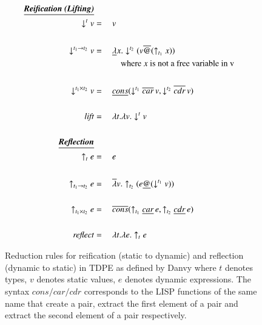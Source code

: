 \documentclass[a4paper,12pt,twoside,openright]{report}
\theoremstyle{definition}
\begin{document}
\newpage
\begin{figure}[htp!]
    \centering
    \begin{alignat}{2}
        \text{\underline{\textbf{\emph{Reification (Lifting)}}}}\nonumber \\
        \downarrow^{t} v & = \: && v \\
        \nonumber \\%
        \downarrow^{t_{1} \rightarrow t_{2}} v & = \: && \underline{\lambda} x.\downarrow^{t_{2}}(v\overline{@}(\uparrow_{t_{1}} x)) \\
        & && \quad\text{where $x$ is not a free variable in v} \nonumber \\
        \nonumber \\%
        \downarrow^{t_{1} \times t_{2}} v & = \: && \underline{cons}(\downarrow^{t_{1}} \overline{car} \, v, \downarrow^{t_{2}} \overline{cdr} \, v) \\
        \nonumber \\%
        \mathit{lift} & = \: && \lambda t. \lambda v. \downarrow^{t} v \\
        \nonumber \\%
        \text{\underline{\textbf{\emph{Reflection}}}}\nonumber \\
        \uparrow_{t} e & = \: && e \\
        \nonumber \\%
        \uparrow_{t_{1} \rightarrow t_{2}} e & = \: && \overline{\lambda} v.\uparrow_{t_{2}}(e\underline{@}(\downarrow^{t_{1}} v)) \\
        \nonumber \\%
        \uparrow_{t_{1} \times t_{2}} e & = \: && \overline{cons}(\uparrow_{t_{1}} \underline{car} \, e, \uparrow_{t_{2}} \underline{cdr} \, e) \\
        \nonumber \\%
        \mathit{reflect} & = \: && \lambda t. \lambda e. \uparrow_{t} e
    \end{alignat}
    \caption{Reduction rules for reification (static to dynamic) and reflection (dynamic to static) in TDPE as defined by Danvy \cite{danvy1999type} where $t$ denotes types, $v$ denotes static values, $e$ denotes dynamic expressions. The syntax $cons/car/cdr$ corresponds to the LISP functions of the same name that create a pair, extract the first element of a pair and extract the second element of a pair respectively.}
    \label{fig:tdpe_rules}
\end{figure}
\newpage
\end{document}
